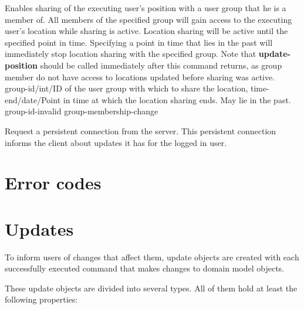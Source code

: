 \documentclass[parskip=full,11pt]{scrartcl}
\begin{document}
{Enables sharing of the executing user's position with a user group that he is
a member of.
All members of the specified group will gain access to the executing user's
location while sharing is active.
Location sharing will be active until the specified point in time.
Specifying a point in time that lies in the past will immediately stop location
sharing with the specified group.
Note that \textbf{update-position} should be called immediately after this
command returns, as group member do not have access to locations updated before
sharing was active.
}
{group-id/int/ID of the user group with which to share the location,
time-end/date/Point in time at which the location sharing ends.
May lie in the past.}
{}
{group-id-invalid}
{group-membership-change}

{Request a persistent connection from the server. This persistent connection
informs the client about updates it has for the logged in user.}
{}
{}
{}
{}


\section{Error codes}\label{sec:errorcodes}
\apiErrorTable

\section{Updates}
To inform users of changes that affect them, update objects are created with
each successfully executed command that makes changes to domain model objects.

These update objects are divided into several types. All of them hold at least
the following properties:




\end{document}
